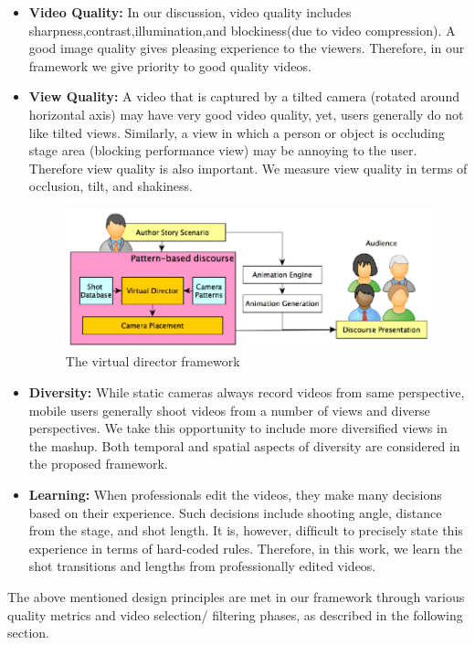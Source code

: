 \documentclass{sig-alternate}
\begin{document}
\begin{itemize}
\item  \textbf{Video Quality:} In our discussion, video quality includes sharpness,contrast,illumination,and blockiness(due to video compression). A good image quality gives pleasing experience to the viewers. Therefore, in our framework we give priority to good quality videos. 
\item \textbf{View Quality:} A video that is captured by a tilted camera (rotated around horizontal axis) may have very good video quality, yet, users generally do not like tilted views. Similarly, a view in which a person or object is occluding stage area (blocking performance view) may be annoying to the user. Therefore view quality is also important. We measure view quality in terms of occlusion, tilt, and shakiness. 
\begin{figure}[h!]
    \centering
    \includegraphics[width= \linewidth]{2.png}
    \caption{The virtual director framework}
    \label{fig: 2}
\end{figure}
\item \textbf{Diversity:} While static cameras always record videos from same perspective, mobile users generally shoot videos from a number of views and diverse perspectives. We take this opportunity to include more diversiﬁed views in the mashup. Both temporal and spatial aspects of diversity are considered in the proposed framework. 
\item \textbf{Learning:} When professionals edit the videos, they make many decisions based on their experience. Such decisions include shooting angle, distance from the stage, and shot length. It is, however, difﬁcult to precisely state this experience in terms of hard-coded rules. Therefore, in this work, we learn the shot transitions and lengths from professionally edited videos.

\end{itemize}

The above mentioned design principles are met in our framework through various quality metrics and video selection/ ﬁltering phases, as described in the following section.
\end{document}
